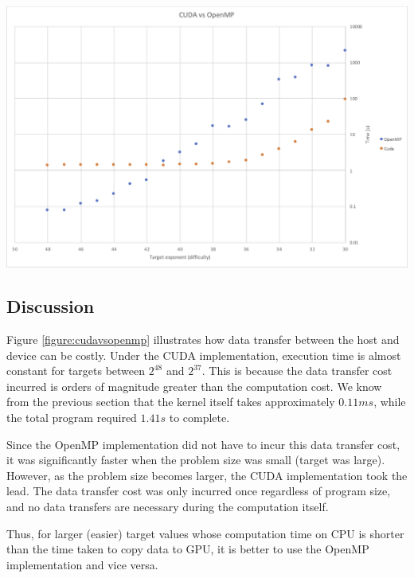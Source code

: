 \documentclass[a4paper,12pt]{article}
\begin{document}
\begin{center}
  \includegraphics[width=\linewidth]{cuda-vs-openmp}
  \label{figure:cudavsopenmp}
\end{center}

\subsection{Discussion}

Figure \ref{figure:cudavsopenmp} illustrates how data transfer between the host and device can be costly. Under the CUDA implementation, execution time is almost constant for targets between $2^{48}$ and $2^{37}$. This is because the data transfer cost incurred is orders of magnitude greater than the computation cost. We know from the previous section that the kernel itself takes approximately $0.11 ms$, while the total program required $1.41 s$ to complete.

Since the OpenMP implementation did not have to incur this data transfer cost, it was significantly faster when the problem size was small (target was large). However, as the problem size becomes larger, the CUDA implementation took the lead. The data transfer cost was only incurred once regardless of program size, and no data transfers are necessary during the computation itself.

Thus, for larger (easier) target values whose computation time on CPU is shorter than the time taken to copy data to GPU, it is better to use the OpenMP implementation and vice versa.

\newpage
\end{document}
